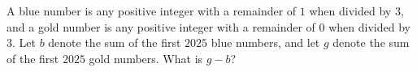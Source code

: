 A blue number is any positive integer with a remainder of $1$ when divided by $3$, and a gold number is any positive integer with a remainder of $0$ when divided by $3$. Let $b$ denote the sum of the first $2025$ blue numbers, and let $g$ denote the sum of the first $2025$ gold numbers. What is $g - b$?
